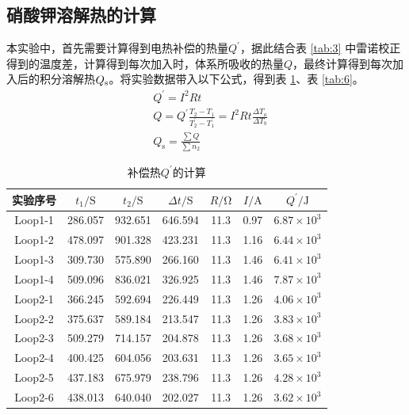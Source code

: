 \documentclass[cn,hazy,pku,12pt,normal,math=newtx,cite=super]{elegantnote}
\begin{document}
\subsection{硝酸钾溶解热的计算}

本实验中，首先需要计算得到电热补偿的热量$Q^\prime$，据此结合表 \ref{tab:3} 中雷诺校正得到的温度差，计算得到每次加入时，体系所吸收的热量$Q$，最终计算得到每次加入后的积分溶解热$Q_{\rm s}$。将实验数据带入以下公式，得到表 \ref{tab:5}、表 \ref{tab:6}。
\begin{align*}
    &Q^\prime = I^2Rt\\
    &Q = Q^\prime\frac{T_2-T_1}{T_2^\prime-T_1^\prime}=I^2Rt\frac{\Delta T_a}{\Delta T_b}\\
    &Q_{\mathrm{s}} = \frac{\sum Q}{\sum n_2}
\end{align*}

\begin{table}[htbp]
    \centering
    \caption{补偿热$Q^\prime$的计算}
    \begin{tabular}{ccccccc}
    \toprule
    实验序号 & $t_1/\mathrm{S}$ & $t_2/\mathrm{S}$ & $\Delta t/\mathrm{S}$ & $R/\mathrm{\Omega}$ & $I/\mathrm{A}$ & $Q^\prime/\mathrm{J}$\\
    \midrule
    Loop1-1 & 286.057 & 932.651 & 646.594 & 11.3 & 0.97 & $6.87\times 10^{3}$\\
    Loop1-2 & 478.097 & 901.328 & 423.231 & 11.3 & 1.16 & $6.44\times 10^{3}$\\
    Loop1-3 & 309.730 & 575.890 & 266.160 & 11.3 & 1.46 & $6.41\times 10^{3}$\\
    Loop1-4 & 509.096 & 836.021 & 326.925 & 11.3 & 1.46 & $7.87\times 10^{3}$\\
    \midrule
    Loop2-1 & 366.245 & 592.694 & 226.449 & 11.3 & 1.26 & $4.06\times 10^{3}$\\
    Loop2-2 & 375.637 & 589.184 & 213.547 & 11.3 & 1.26 & $3.83\times 10^{3}$\\
    Loop2-3 & 509.279 & 714.157 & 204.878 & 11.3 & 1.26 & $3.68\times 10^{3}$\\
    Loop2-4 & 400.425 & 604.056 & 203.631 & 11.3 & 1.26 & $3.65\times 10^{3}$\\
    Loop2-5 & 437.183 & 675.979 & 238.796 & 11.3 & 1.26 & $4.28\times 10^{3}$\\
    Loop2-6 & 438.013 & 640.040 & 202.027 & 11.3 & 1.26 & $3.62\times 10^{3}$\\
    \bottomrule
    \end{tabular}
    \label{tab:5}
\end{table}
\end{document}
